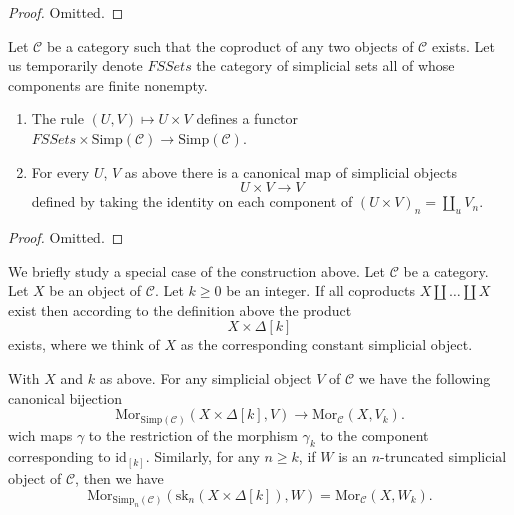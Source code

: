 \begin{proof}
Omitted.
\end{proof}

\begin{lemma}
\label{lemma-back-to-U}
Let $\mathcal{C}$ be a category such that the coproduct of
any two objects of $\mathcal{C}$ exists. Let us temporarily
denote $\textit{FSSets}$ the category of simplicial sets
all of whose components are finite nonempty.
\begin{enumerate}
\item The rule $(U, V) \mapsto U \times V$
defines a functor
$\textit{FSSets} \times \text{Simp}(\mathcal{C})
\to \text{Simp}(\mathcal{C})$.
\item For every $U$, $V$ as above
there is a canonical map of simplicial objects
$$
U \times V \longrightarrow V
$$
defined by taking the identity on each component of
$(U \times V)_n = \coprod_u V_n$.
\end{enumerate}
\end{lemma}

\begin{proof}
Omitted.
\end{proof}

\noindent
We briefly study a special case of the construction
above. Let $\mathcal{C}$ be a category.
Let $X$ be an object of $\mathcal{C}$.
Let $k \geq 0$ be an integer.
If all coproducts $X \coprod \ldots \coprod X$ exist
then according to the definition above the product
$$
X \times \Delta[k]
$$
exists, where we think of $X$ as the corresponding constant
simplicial object.

\begin{lemma}
\label{lemma-morphism-from-coproduct}
With $X$ and $k$ as above.
For any simplicial object $V$ of
$\mathcal{C}$ we have the following
canonical bijection
$$
\text{Mor}_{\text{Simp}(\mathcal{C})}(X \times \Delta[k], V)
\longrightarrow
\text{Mor}_{\mathcal{C}}(X, V_k).
$$
wich maps $\gamma$ to the restriction of the
morphism $\gamma_k$ to the component corresponding
to $\text{id}_{[k]}$.
Similarly, for any $n \geq k$, if $W$ is an
$n$-truncated simplicial object
of $\mathcal{C}$, then we have
$$
\text{Mor}_{\text{Simp}_n(\mathcal{C})}(\text{sk}_n(X \times \Delta[k]), W)
=
\text{Mor}_{\mathcal{C}}(X, W_k).
$$
\end{lemma}

